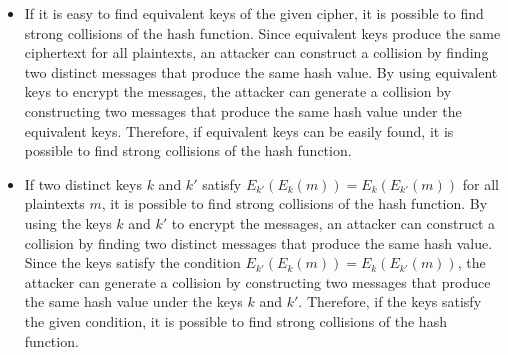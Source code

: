 \documentclass[11pt,epsfig]{article}
\begin{document}
\begin{description}
\begin{itemize}
\item If it is easy to find equivalent keys of the given cipher, it is possible to find strong collisions of the hash function. Since equivalent keys produce the same ciphertext for all plaintexts, an attacker can construct a collision by finding two distinct messages that produce the same hash value. By using equivalent keys to encrypt the messages, the attacker can generate a collision by constructing two messages that produce the same hash value under the equivalent keys. Therefore, if equivalent keys can be easily found, it is possible to find strong collisions of the hash function.
\item If two distinct keys $k$ and $k'$ satisfy $E_{k'}(E_k(m))=E_k(E_{k'}(m))$ for all plaintexts $m$, it is possible to find strong collisions of the hash function. By using the keys $k$ and $k'$ to encrypt the messages, an attacker can construct a collision by finding two distinct messages that produce the same hash value. Since the keys satisfy the condition $E_{k'}(E_k(m))=E_k(E_{k'}(m))$, the attacker can generate a collision by constructing two messages that produce the same hash value under the keys $k$ and $k'$. Therefore, if the keys satisfy the given condition, it is possible to find strong collisions of the hash function.
\end{itemize}











 

\end{description} 
\end{document}
